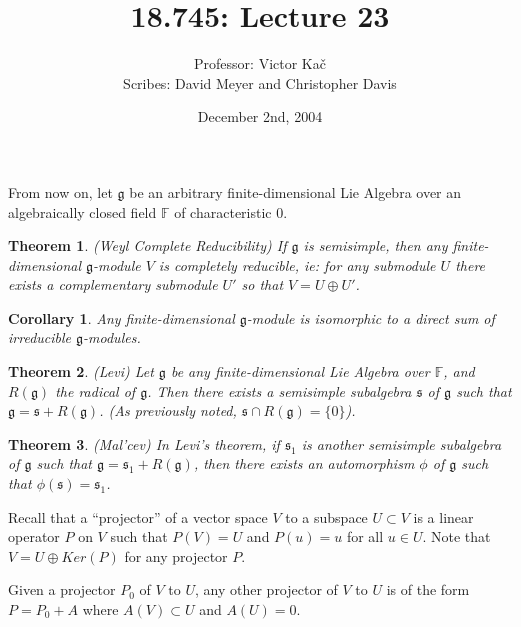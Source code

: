 \documentclass{amsart}
\title{18.745: Lecture 23}
\author{Professor: Victor Ka\v{c}\\ Scribes: 
David Meyer and Christopher Davis}
\date{December 2nd, 2004}
\newtheorem*{Theorem}{Theorem}
\newtheorem*{cor}{Corollary}
\newcommand*{\g}{\mathfrak{g}}
\newcommand{\F}{{\mathbb{F}}}
\newcommand{\s}{{\mathfrak{s}}}
\begin{document}
\maketitle

From now on, let $\g$ be an arbitrary finite-dimensional Lie Algebra 
over an algebraically closed field $\F$ of characteristic 0.

\begin{Theorem} (Weyl Complete Reducibility)
If $\g$ is semisimple, then any finite-dimensional $\g$-module $V$ is 
completely reducible, ie:
for any submodule $U$ there exists a complementary submodule $U'$ 
so that $V = U \oplus U'$.
\end{Theorem}

\begin{cor}
Any finite-dimensional $\g$-module is isomorphic to a direct sum of 
irreducible $\g$-modules.
\end{cor}

\begin{Theorem} (Levi)
Let $\g$ be any finite-dimensional Lie Algebra over $\F$, 
and $R(\g)$ the radical of $\g$. Then there exists a semisimple 
subalgebra $\s$ of $\g$ such that $\g = \s + R(\g)$.
(As previously noted, $\s \cap R(\g) = \{0\}$).
\end{Theorem}

\begin{Theorem} (Mal'cev)
In Levi's theorem, if $\s_1$ is another semisimple subalgebra of $\g$ 
such that $\g = \s_1 + R(\g)$,
then there exists an automorphism $\phi$ of $\g$ such that $\phi(\s) = \s_1$.
\end{Theorem}

Recall that a ``projector'' of a vector space $V$ to a subspace $U
\subset 
V$ is a linear operator $P$ on $V$ such that
$P(V)=U$ and $P(u) = u$ for all $u \in U$. Note that $V = U \oplus
Ker(P)$ 
for any projector $P$.

Given a projector $P_0$ of $V$ to $U$, any other projector of $V$ to
$U$ 
is of the form $P = P_0 + A$ where
$A(V) \subset U$ and $A(U) = 0$. 
\end{document}
